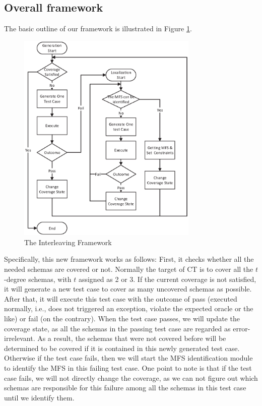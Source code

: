 \documentclass[10pt,journal,compsoc]{IEEEtran}
\begin{document}
\subsection{Overall framework}\label{sec:app:frame}
 The basic outline of our framework is illustrated in Figure \ref{new-life}.
\begin{figure}
 \includegraphics[width=3.4in]{baicOutline.eps}
\caption{The Interleaving Framework}
\label{new-life}
\end{figure}
Specifically, this new framework works as follows: First, it checks whether all the needed schemas are covered or not. Normally the target of CT is to cover all the $t$-degree schemas, with $t$ assigned as 2 or 3. If the current coverage is not satisfied, it will generate a new test case to cover as many uncovered schemas as possible. After that, it will execute this test case with the outcome of pass (executed normally, i.e., does not triggered an exception, violate the expected oracle or the like) or fail (on the contrary). When the test case passes, we will update the coverage state, as all the schemas in the passing test case are regarded as error-irrelevant. As a result, the schemas that were not covered before will be determined to be covered if it is contained in this newly generated test case. Otherwise if the test case fails, then we will start the MFS identification module to identify the MFS in this failing test case. One point to note is that if the test case fails, we will not directly change the coverage, as we can not figure out which schemas are responsible for this failure among all the schemas in this test case until we identify them.
\end{document}
